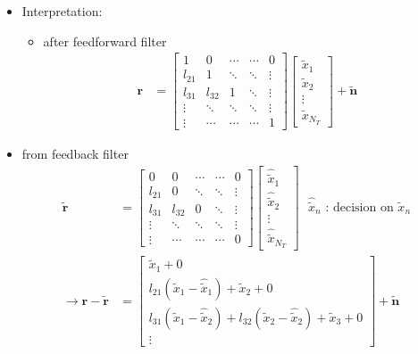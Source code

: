 \documentclass[a4paper, 10pt]{article}
\begin{document}
\begin{itemize}
\begin{itemize}
	\end{itemize}
	\item Interpretation:
	\begin{itemize}
		\item after feedforward filter
	\begin{align*}
			\mathbf{r} &= 
			\begin{bmatrix}
				1 & 0 & \cdots & \cdots & 0 \\
				l_{21} & 1 & \ddots & \ddots &	\vdots \\
				l_{31} & l_{32} & 1 & \ddots &\vdots \\
				\vdots & \ddots & \ddots & \ddots & \vdots\\
				\vdots & \cdots & \cdots & \cdots & 1
			\end{bmatrix}
			\begin{bmatrix}
				\tilde{x}_1 \\
				\tilde{x}_2 \\
				\vdots \\
				\tilde{x}_{N_T}
			\end{bmatrix}
			+ \tilde{\mathbf{n}}
	\end{align*}
	\end{itemize}
	\item from feedback filter
	\begin{align*}
			\tilde{\mathbf{r}} &= 
			\begin{bmatrix}
				0 & 0 & \cdots & \cdots & 0 \\
				l_{21} & 0 & \ddots & \ddots &	\vdots \\
				l_{31} & l_{32} & 0 & \ddots &\vdots \\
				\vdots & \ddots & \ddots & \ddots & \vdots\\
				\vdots & \cdots & \cdots & \cdots & 0
			\end{bmatrix}
			\begin{bmatrix}
				\hat{\tilde{x}}_1 \\
				\hat{\tilde{x}}_2 \\
				\vdots \\
				\hat{\tilde{x}}_{N_T}
			\end{bmatrix}
			\text{ $\hat{\tilde{x}}_n$ : decision on $\tilde{x}_n$}\\
			\rightarrow \mathbf{r}-\tilde{\mathbf{r}} &= 
			\begin{bmatrix}
			\tilde{x}_1+0 \\
			l_{21}(\tilde{x}_1-\hat{\tilde{x}}_1)+\tilde{x}_2+0 \\
			l_{31}(\tilde{x}_1-\hat{\tilde{x}}_2)+l_{32}(\tilde{x}_2-\hat{\tilde{x}}_2)+\tilde{x}_3+0 \\
			\vdots
			\end{bmatrix}
			+\tilde{\mathbf{n}}
	\end{align*}
\end{itemize}
\end{document}
